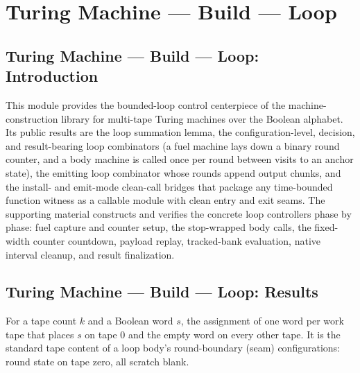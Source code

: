 \section{Turing Machine --- Build --- Loop}
\subsection*{Turing Machine --- Build --- Loop: Introduction}

This module provides the bounded-loop control centerpiece of the machine-construction
library for multi-tape Turing machines over the Boolean alphabet. Its public results are
the loop summation lemma, the configuration-level, decision, and result-bearing loop
combinators (a fuel machine lays down a binary round counter, and a body machine is
called once per round between visits to an anchor state), the emitting loop combinator
whose rounds append output chunks, and the install- and emit-mode clean-call bridges
that package any time-bounded function witness as a callable module with clean entry and
exit seams. The supporting material constructs and verifies the concrete loop
controllers phase by phase: fuel capture and counter setup, the stop-wrapped body calls,
the fixed-width counter countdown, payload replay, tracked-bank evaluation, native
interval cleanup, and result finalization.

\subsection*{Turing Machine --- Build --- Loop: Results}

\begin{definition}
\label{Turing.stateWord}
\leanok
For a tape count $k$ and a Boolean word $s$, the assignment of one word per work tape
that places $s$ on tape $0$ and the empty word on every other tape. It is the standard
tape content of a loop body's round-boundary (seam) configurations: round state on tape
zero, all scratch blank.
\end{definition}

